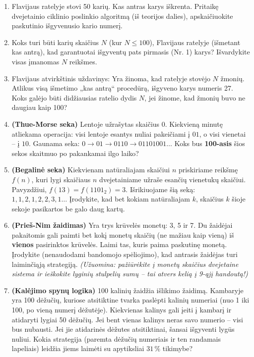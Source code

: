 \documentclass[11pt,a4paper]{scrartcl}
\begin{document}
\begin{enumerate}
    \item Flavijaus ratelyje stovi 50 karių. Kas antras karys iškrenta. Pritaikę dvejetainio ciklinio poslinkio algoritmą (iš teorijos dalies), apskaičiuokite paskutinio išgyvenusio kario numerį.
    \item Koks turi būti karių skaičius $N$ (kur $N \le 100$), Flavijaus ratelyje (išmetant kas antrą), kad garantuotai išgyventų pats pirmasis (Nr. 1) karys? Išvardykite visas įmanomas $N$ reikšmes.
    \item Flavijaus atvirkštinis uždavinys: Yra žinoma, kad ratelyje stovėjo $N$ žmonių. Atlikus visą išmetimo „kas antrą“ procedūrą, išgyveno karys numeris 27. Koks galėjo būti didžiausias ratelio dydis $N$, jei žinome, kad žmonių buvo ne daugiau kaip 100?
    
    \item \textbf{(Thue-Morse seka)} Lentoje užrašytas skaičius $0$. Kiekvieną minutę atliekama operacija: visi lentoje esantys nuliai pakeičiami į $01$, o visi vienetai – į $10$. Gaunama seka: $0 \to 01 \to 0110 \to 01101001 \dots$ Koks bus \textbf{100-asis} šios sekos skaitmuo po pakankamai ilgo laiko?
    \item \textbf{(Begalinė seka)} Kiekvienam natūraliajam skaičiui $n$ priskiriame reikšmę $f(n)$, kuri lygi skaičiaus $n$ dvejetainiame užraše esančių vienetukų skaičiui. Pavyzdžiui, $f(13) = f(1101_2) = 3$. Išrikiuojame šią seką: $1, 1, 2, 1, 2, 2, 3, 1 \dots$ Įrodykite, kad bet kokiam natūraliajam $k$, skaičius $k$ šioje sekoje pasikartos be galo daug kartų.
    \item \textbf{(Prieš-Nim žaidimas)} Yra trys krūvelės monetų: 3, 5 ir 7. Du žaidėjai pakaitomis gali paimti bet kokį monetų skaičių (ne mažiau kaip vieną) iš \textbf{vienos} pasirinktos krūvelės. Laimi tas, kuris paima paskutinę monetą. Įrodykite (nenaudodami bandomojo spėliojimo), kad antrasis žaidėjas turi laiminčiąją strategiją. \textit{(Užuomina: pažiūrėkite į monetų skaičius dvejetaine sistema ir ieškokite lyginių stulpelių sumų – tai atvers kelią į 9-ąjį handoutą!)}
    \item \textbf{(Kalėjimo spynų logika)} 100 kalinių žaidžia išlikimo žaidimą. Kambaryje yra 100 dėžučių, kuriose atsitiktine tvarka paslėpti kalinių numeriai (nuo 1 iki 100, po vieną numerį dėžutėje). Kiekvienas kalinys gali įeiti į kambarį ir atidaryti lygiai 50 dėžučių. Jei bent vienas kalinys neras savo numerio – visi bus nubausti. 
    Jei jie atidarinės dėžutes atsitiktinai, šansai išgyventi lygūs nuliui. Kokia strategija (paremta dėžučių numeriais ir ten randamais lapeliais) leidžia jiems laimėti su apytiksliai $31\,\%$ tikimybe?
\end{enumerate}
\end{document}
